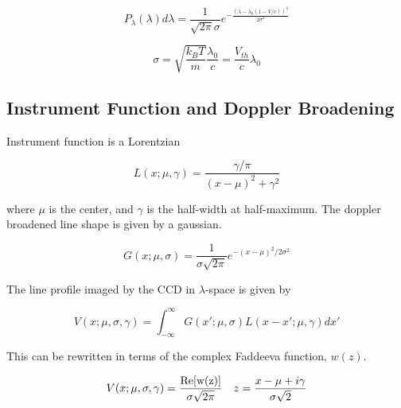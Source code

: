 \documentclass{article}
\begin{document}
\begin{equation}
P_{\lambda}(\lambda) d \lambda = \frac{1}{\sqrt{2 \pi} \sigma} e^{-\frac{\left(\lambda - \lambda_0(1 - V/c)\right)^2}{2 \sigma^2}}
\end{equation}

\begin{equation}
\sigma = \sqrt{\frac{k_B T}{m}} \frac{\lambda_0}{c} = \frac{V_{th}}{c} \lambda_0
\end{equation}

\subsection{Instrument Function and Doppler Broadening}

Instrument function is a Lorentzian

\begin{equation}
L(x;\mu,\gamma) = \frac{\gamma / \pi}{(x-\mu)^2 + \gamma^2}
\end{equation}

where $\mu$ is the center, and $\gamma$ is the half-width at half-maximum.  The doppler broadened line shape is given by a gaussian.

\begin{equation}
G(x;\mu, \sigma) = \frac{1}{\sigma \sqrt{2 \pi}} e^{-(x-\mu)^2 / 2 \sigma^2}
\end{equation}

The line profile imaged by the CCD in $\lambda$-space is given by

\begin{equation}
V(x;\mu,\sigma,\gamma) = \int_{-\infty}^{\infty} G(x';\mu,\sigma) L(x-x';\mu,\gamma) dx' 
\end{equation}

This can be rewritten in terms of the complex Faddeeva function, $w(z)$.

\begin{equation}
 V(x;\mu,\sigma,\gamma) = \frac{\rm{Re}[w(z)]}{\sigma \sqrt{2 \pi}} \quad z=\frac{x - \mu + i \gamma}{\sigma \sqrt{2}}
\end{equation} 

%

%

\end{document}
